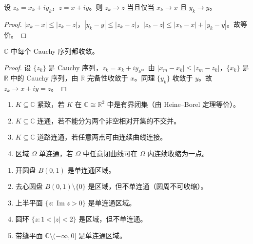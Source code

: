 \begin{proposition}[复数列收敛的坐标刻画]\label{prop:ca_seq_coordinate}
设 $z_k = x_k + i y_k$，$z = x + iy$。则 $z_k \to z$ 当且仅当 $x_k \to x$ 且 $y_k \to y$。
\end{proposition}

\begin{proof}
$|x_k - x| \le |z_k - z|$，$|y_k - y| \le |z_k - z|$，$|z_k - z| \le |x_k - x| + |y_k - y|$。故等价。
\end{proof}

\begin{theorem}\label{thm:ca_completeness}
$\mathbb{C}$ 中每个 Cauchy 序列都收敛。
\end{theorem}

\begin{proof}
设 $\{z_k\}$ 是 Cauchy 序列，$z_k = x_k + iy_k$。由 $|x_m - x_k| \le |z_m - z_k|$，$\{x_k\}$ 是 $\mathbb{R}$ 中的 Cauchy 序列，由 $\mathbb{R}$ 完备性收敛于 $x$。同理 $\{y_k\}$ 收敛于 $y$。故 $z_k \to x + iy = z$。
\end{proof}

\begin{definition}[紧致性与连通性]\label{def:ca_compact_connected}
\begin{enumerate}[label=(\roman*)]
    \item $K \subseteq \mathbb{C}$ 紧致，若 $K$ 在 $\mathbb{C} \cong \mathbb{R}^2$ 中是有界闭集（由 Heine--Borel 定理等价）。
    \item $K \subseteq \mathbb{C}$ 连通，若不能分为两个非空相对开集的不交并。
    \item $K \subseteq \mathbb{C}$ 道路连通，若任意两点可由连续曲线连接。
    \item 区域 $\Omega$ 单连通，若 $\Omega$ 中任意闭曲线可在 $\Omega$ 内连续收缩为一点。
\end{enumerate}
\end{definition}

\begin{example}[复平面上的拓扑实例]\label{ex:ca_topology_examples}
\begin{enumerate}[label=(\roman*)]
    \item 开圆盘 $B(0, 1)$ 是单连通区域。
    \item 去心圆盘 $B(0, 1) \setminus \{0\}$ 是区域，但不单连通（圆周不可收缩）。
    \item 上半平面 $\{z : \operatorname{Im} z > 0\}$ 是单连通区域。
    \item 圆环 $\{z : 1 < |z| < 2\}$ 是区域，但不单连通。
    \item 带缝平面 $\mathbb{C} \setminus (-\infty, 0]$ 是单连通区域。
\end{enumerate}
\end{example}

